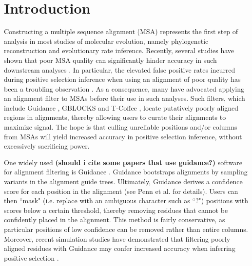 \documentclass[10pt]{article}
\begin{document}
\section*{Introduction}
Constructing a multiple sequence alignment (MSA) represents the first step of analysis in most studies of molecular evolution, namely phylogenetic reconstruction and evolutionary rate inference. Recently, several studies have shown that poor MSA quality can significantly hinder accuracy in such downstream analyses \citep{Jordan2011, MarkovaRaina2011, Dwivedi2009, Talavera2007, Ogden2006}. In particular, the elevated false positive rates incurred during positive selection inference when using an alignment of poor quality has been a troubling observation  \citep{Jordan2011, Privman2012, Schneider2009, Fletcher2010}. As a consequence, many have advocated applying an alignment filter to MSAs before their use in such analyses. Such filters, which include Guidance \citep{Penn2010, Privman2012}, GBLOCKS \citep{Castresana2000} and T-Coffee \citep{Notredame2000}, locate putatively poorly aligned regions in alignments, thereby allowing users to curate their alignments to maximize signal. The hope is that culling unreliable positions and/or columns from MSAs will yield increased accuracy in positive selection inference, without excessively sacrificing power.

One widely used \textbf{(should i cite some papers that use guidance?)} software for alignment filtering is Guidance \citep{Penn2010}. Guidance bootstraps alignments by sampling variants in the alignment guide trees. Ultimately, Guidance derives a confidence score for each position in the alignment (see Penn et al. for details). Users can then ``mask" (i.e. replace with an ambiguous character such as ``?") positions with scores below a certain threshold, thereby removing residues that cannot be confidently placed in the alignment. This method is fairly conservative, as particular positions of low confidence can be removed rather than entire columns. Moreover, recent simulation studies have demonstrated that filtering poorly aligned residues with Guidance may confer increased accuracy when inferring positive selection \citep{Jordan2011,Privman2012}. 
\end{document}
